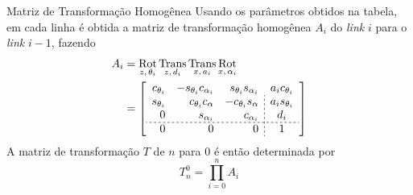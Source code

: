 \documentclass[aspectratio=169]{beamer}
\DeclareMathOperator{\Rot}{Rot}
\DeclareMathOperator{\Trans}{Trans}
\begin{document}
\begin{frame}{Matriz de Transformação Homogênea}
Usando os parâmetros obtidos na tabela, em cada linha é obtida a matriz de transformação homogênea $A_i$ do \textit{link} $i$ para o \textit{link} $i-1$, fazendo
\begin{align*}
  \setlength{\dashlinegap}{2pt}
    A_i
    &= \Rot_{z,\,\theta_i} \Trans_{z,\,d_i} \Trans_{x,\,a_i} \Rot_{x,\,\alpha_i} \\
    &=
    \left[ 
    \begin{array}{rrr;{2pt/2pt}c}
        c_{\theta_i} & -s_{\theta_i}c_{\alpha_i} & s_{\theta_i} s_{\alpha_i} & a_i c_{\theta_i} \\
        s_{\theta_i} & c_{\theta_i} c_{\alpha} & -c_{\theta_i} s_{\alpha} & a_i s_{\theta_i} \\
        0 & s_{\alpha_i} & c_{\alpha_i} & d_i \\
        \hdashline[2pt/2pt]
        0 & 0 & 0 & 1
    \end{array}
    \right]
\end{align*}
A matriz de transformação $T$ de $n$ para 0 é então determinada por
\begin{equation*}
    T_n^0 = \prod_{i=0}^n A_i
\end{equation*}
\end{frame}
\end{document}
